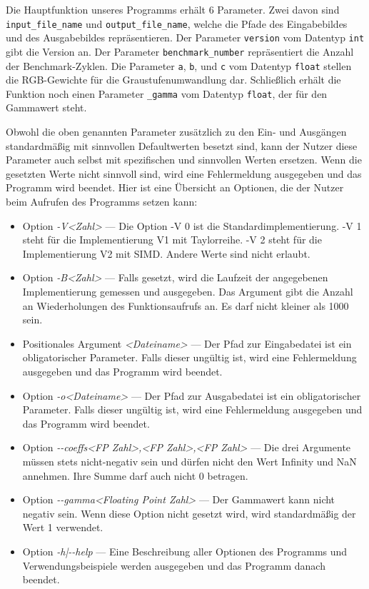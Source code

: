 \documentclass[course=erap]{aspdoc}
\begin{document}
\par
Die Hauptfunktion unseres Programms erhält 6 Parameter. Zwei davon sind \texttt{input\_file\_name} und \texttt{output\_file\_name}, welche die Pfade des Eingabebildes und des Ausgabebildes repräsentieren. Der Parameter \texttt{version} vom Datentyp \texttt{int} gibt die Version an. Der Parameter \texttt{benchmark\_number} repräsentiert die Anzahl der Benchmark-Zyklen. Die Parameter \texttt{a}, \texttt{b}, und \texttt{c} vom Datentyp \texttt{float} stellen die RGB-Gewichte für die Graustufenumwandlung dar. Schließlich erhält die Funktion noch einen Parameter \texttt{\_gamma} vom Datentyp \texttt{float}, der für den Gammawert steht.

\par
Obwohl die oben genannten Parameter zusätzlich zu den Ein- und Ausgängen standardmäßig mit sinnvollen Defaultwerten besetzt sind, kann der Nutzer diese Parameter auch selbst mit spezifischen und sinnvollen Werten ersetzen. Wenn die gesetzten Werte nicht sinnvoll sind, wird eine Fehlermeldung ausgegeben und das Programm wird beendet. Hier ist eine Übersicht an Optionen, die der Nutzer beim Aufrufen des Programms setzen kann:

\begin{itemize}
\item Option \emph{-V<Zahl>} --- Die Option -V 0 ist die Standardimplementierung. -V 1 steht für die Implementierung V1 mit Taylorreihe. -V 2 steht für die Implementierung V2 mit SIMD. Andere Werte sind nicht erlaubt.
\item Option \emph{-B<Zahl>} --- Falls gesetzt, wird die Laufzeit der angegebenen Implementierung gemessen und ausgegeben. Das Argument gibt die Anzahl an Wiederholungen des Funktionsaufrufs an. Es darf nicht kleiner als 1000 sein.
\item Positionales Argument \emph{<Dateiname>} --- Der Pfad zur Eingabedatei ist ein obligatorischer Parameter. Falls dieser ungültig ist, wird eine Fehlermeldung ausgegeben und das Programm wird beendet.
\item Option \emph{-o<Dateiname>} --- Der Pfad zur Ausgabedatei ist ein obligatorischer Parameter. Falls dieser ungültig ist, wird eine Fehlermeldung ausgegeben und das Programm wird beendet.
\item Option \emph{-{}-coeffs<FP Zahl>,<FP Zahl>,<FP Zahl>} --- Die drei Argumente müssen stets nicht-negativ sein und dürfen nicht den Wert Infinity und NaN annehmen. Ihre Summe darf auch nicht 0 betragen.
\item Option \emph{-{}-gamma<Floating Point Zahl>} --- Der Gammawert kann nicht negativ sein. Wenn diese Option nicht gesetzt wird, wird standardmäßig der Wert 1 verwendet.
\item Option \emph{-h|-{}-help} --- Eine Beschreibung aller Optionen des Programms und Verwendungsbeispiele werden ausgegeben und das Programm danach beendet. 
\end{itemize}
\end{document}
